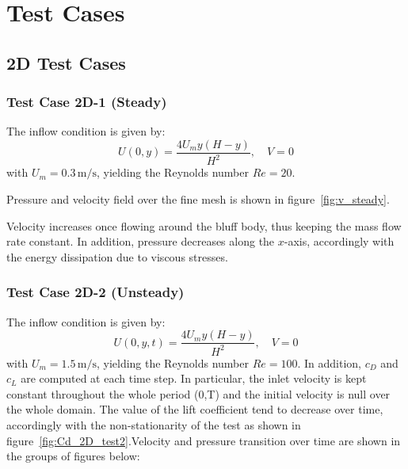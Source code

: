 \documentclass{article}
\begin{document}
\section{Test Cases}
\subsection{2D Test Cases}
\subsubsection{Test Case 2D-1 (Steady)}

The inflow condition is given by:
\[
U(0, y) = \frac{4U_m y (H - y)}{H^2}, \quad V = 0
\]
with \(U_m = 0.3 \, \text{m/s}\), yielding the Reynolds number \(Re = 20\). 

Pressure and velocity field over the fine mesh is shown in figure~\ref{fig:v_steady}.

\begin{figure}[H]
    \centering    
    \hfill
\end{figure}

Velocity increases once flowing around the bluff body, thus keeping the mass flow rate constant. In addition, pressure decreases along the \(x\)-axis, accordingly with the energy dissipation due to viscous stresses.


\subsubsection{Test Case 2D-2 (Unsteady)}
    The inflow condition is given by:
    \[
    U(0, y, t) = \frac{4U_m y (H - y)}{H^2}, \quad V = 0
    \]
    with \(U_m = 1.5 \, \text{m/s}\), yielding the Reynolds number \(Re = 100\). 
In addition, \(c_D\) and \(c_L\) are computed at each time step. In particular, the inlet velocity is kept constant throughout the whole period (0,T) and the initial velocity is null over the whole domain. The value of the lift coefficient tend to decrease over time, accordingly with the non-stationarity of the test as shown in figure~\ref{fig:Cd_2D_test2}.Velocity and pressure transition over time are shown in the groups of figures below:
\begin{figure}[H]
    \centering
    \hfill
    \label{fig:Cd_Cl_2D_test2}
\end{figure}
\end{document}
